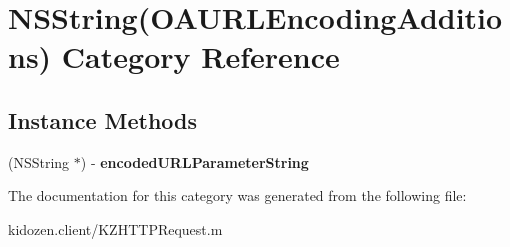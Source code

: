 \hypertarget{category_n_s_string_07_o_a_u_r_l_encoding_additions_08}{\section{N\-S\-String(O\-A\-U\-R\-L\-Encoding\-Additions) Category Reference}
\label{category_n_s_string_07_o_a_u_r_l_encoding_additions_08}
}
\subsection*{Instance Methods}
\begin{DoxyCompactItemize}
\item 
\hypertarget{category_n_s_string_07_o_a_u_r_l_encoding_additions_08_a39ac1280e5bb105872020f7dee30b6be}{(N\-S\-String $\ast$) -\/ {\bfseries encoded\-U\-R\-L\-Parameter\-String}}\label{category_n_s_string_07_o_a_u_r_l_encoding_additions_08_a39ac1280e5bb105872020f7dee30b6be}

\end{DoxyCompactItemize}


The documentation for this category was generated from the following file\-:\begin{DoxyCompactItemize}
\item 
kidozen.\-client/K\-Z\-H\-T\-T\-P\-Request.\-m\end{DoxyCompactItemize}
